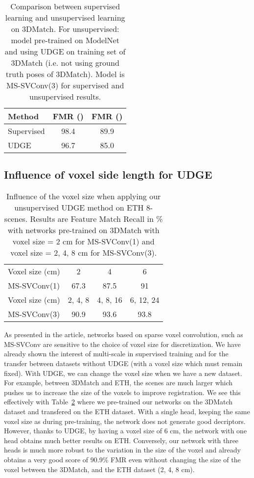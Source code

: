 \documentclass[10pt,twocolumn,letterpaper]{article}
\begin{document}
\begin{table}[ht]
\small
\centering
\begin{tabular}[t]{lcc}
\toprule
Method & FMR () &  FMR ()\\
\midrule
Supervised  & 98.4 & 89.9 \\
UDGE & 96.7 & 85.0 \\
\bottomrule
\end{tabular}
\caption{Comparison between supervised learning and unsupervised learning on 3DMatch. For unsupervised: model pre-trained on ModelNet and using UDGE on training set of 3DMatch (i.e. not using ground truth poses of 3DMatch). Model is MS-SVConv(3) for supervised and unsupervised results.}
\label{tab:svsss}
\end{table}



\subsection{Influence of voxel side length for UDGE}

\begin{table}[ht]
\small
\centering
\begin{tabular}[t]{lccc}
\toprule
Voxel size (cm) & 2 & 4 & 6 \\
MS-SVConv(1) & 67.3 &87.5 & 91 \\
\midrule
Voxel size (cm) & 2, 4, 8 & 4, 8, 16 & 6, 12, 24 \\
MS-SVConv(3) & 90.9 & 93.6 & 93.8 \\
\bottomrule
\end{tabular}
\caption{Influence of the voxel size when applying our unsupervised UDGE method on ETH 8-scenes. Results are Feature Match Recall in \% with networks pre-trained on 3DMatch with voxel size = 2 cm for MS-SVConv(1) and voxel size = 2, 4, 8 cm for MS-SVConv(3).}
\label{tab:size_voxel}
\end{table}

As presented in the article, networks based on sparse voxel convolution, such as MS-SVConv are sensitive to the choice of voxel size for discretization. We have already shown the interest of multi-scale in supervised training and for the transfer between datasets without UDGE (with a voxel size which must remain fixed). With UDGE, we can change the voxel size when we have a new dataset. For example, between 3DMatch and ETH, the scenes are much larger which pushes us to increase the size of the voxels to improve registration. We see this effectively with Table~\ref{tab:size_voxel} where we pre-trained our networks on the 3DMatch dataset and transfered on the ETH dataset.
With a single head, keeping the same voxel size as during pre-training, the network does not generate good decriptors. However, thanks to UDGE, by having a voxel size of 6 cm, the network with one head obtains much better results on ETH. Conversely, our network with three heads is much more robust to the variation in the size of the voxel and already obtains a very good score of 90.9\% FMR even without changing the size of the voxel between the 3DMatch, and the ETH  dataset (2, 4, 8 cm). 
\end{document}
